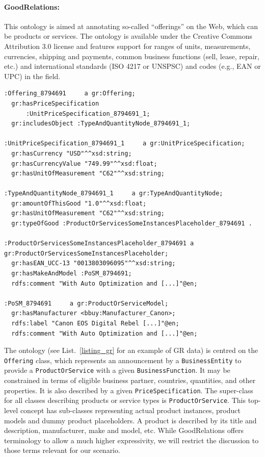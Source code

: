 \paragraph{GoodRelations:}
This ontology is aimed at annotating so-called ``offerings'' on the Web, which can be products or services. The ontology is  available under the Creative Commons Attribution 3.0 license and features support for ranges of units, measurements, currencies,  shipping and payments, common business functions (sell, lease, repair, etc.) and international standards (ISO 4217 or UNSPSC) and codes (e.g., EAN or UPC) in the field.

\begin{center}
\lstset{captionpos=b, breaklines=true}
\lstset{frame=single, basicstyle=\scriptsize}
\lstset{caption=Basic GoodRelations data in N3 notation, label=listing_gr}
\lstset{language=XML}
\begin{lstlisting}
:Offering_8794691     a gr:Offering;
  gr:hasPriceSpecification 
      :UnitPriceSpecification_8794691_1;
  gr:includesObject :TypeAndQuantityNode_8794691_1;

:UnitPriceSpecification_8794691_1     a gr:UnitPriceSpecification;
  gr:hasCurrency "USD"^^xsd:string;
  gr:hasCurrencyValue "749.99"^^xsd:float;
  gr:hasUnitOfMeasurement "C62"^^xsd:string;

:TypeAndQuantityNode_8794691_1     a gr:TypeAndQuantityNode;
  gr:amountOfThisGood "1.0"^^xsd:float;
  gr:hasUnitOfMeasurement "C62"^^xsd:string;
  gr:typeOfGood :ProductOrServicesSomeInstancesPlaceholder_8794691 .

:ProductOrServicesSomeInstancesPlaceholder_8794691 a gr:ProductOrServicesSomeInstancesPlaceholder;
  gr:hasEAN_UCC-13 "0013803096095"^^xsd:string;
  gr:hasMakeAndModel :PoSM_8794691;
  rdfs:comment "With Auto Optimization and [...]"@en;

:PoSM_8794691     a gr:ProductOrServiceModel;
  gr:hasManufacturer <bbuy:Manufacturer_Canon>;
  rdfs:label "Canon EOS Digital Rebel [...]"@en;
  rdfs:comment "With Auto Optimization and [...]"@en;
\end{lstlisting}
\end{center}

The ontology (see List.~\ref{listing_gr} for an example of GR data)  is centred on the \texttt{Offering} class,
which represents an announcement by a \texttt{BusinessEntity} to provide a \texttt{ProductOrService} with a given \texttt{BusinessFunction}. It may be constrained in terms of eligible business partner, countries, quantities, and other properties. It is also described by a given \texttt{PriceSpecification}. The super-class for all classes describing products or service types is \texttt{ProductOrService}. This top-level concept has sub-classes representing actual product instances, product models and dummy product placeholders. A product is described by its title and description, manufacturer, make and model, etc. While GoodRelations offers terminology to allow a much higher expressivity, we will restrict the discussion to those terms relevant for our scenario.

